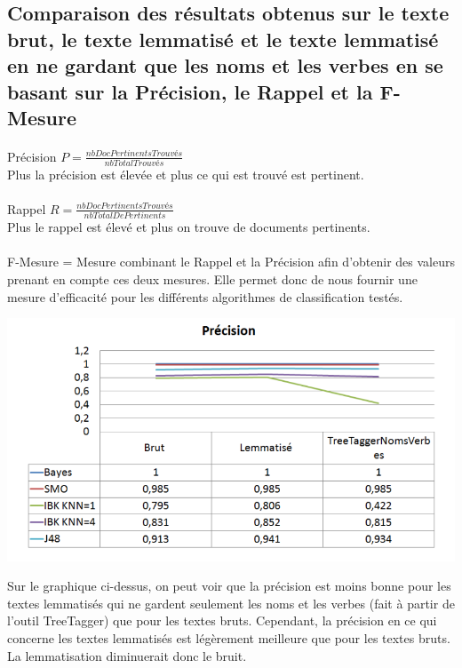 \documentclass[a4paper,11pt]{article}
\begin{document}
\subsection{Comparaison des résultats obtenus sur le texte brut, le texte lemmatisé et le texte lemmatisé en ne gardant que les noms et les verbes en se basant sur la Précision, le Rappel et la F-Mesure}
\paragraph{}
Précision $ P =  \frac{nbDocPertinentsTrouvés}{nbTotalTrouvés}$ \\
Plus la précision est élevée et plus ce qui est trouvé est pertinent.
\paragraph{}
Rappel $ R = \frac{nbDocPertinentsTrouvés}{nbTotalDePertinents}$ \\
Plus le rappel est élevé et plus on trouve de documents pertinents.
\paragraph{}
F-Mesure = Mesure combinant le Rappel et la Précision afin d’obtenir des valeurs prenant en compte ces deux mesures. Elle permet donc de nous fournir une mesure d'efficacité pour les différents algorithmes de classification testés.


\begin{center}
\includegraphics[scale=0.4]{precision.png}
\end{center}

Sur le graphique ci-dessus, on peut voir que la précision est moins bonne pour les textes lemmatisés qui ne gardent seulement les noms et les verbes (fait à partir de l’outil TreeTagger) que pour les textes bruts. Cependant, la précision en ce qui concerne les textes lemmatisés est légèrement meilleure que pour les textes bruts. La lemmatisation diminuerait donc le bruit.
\end{document}
